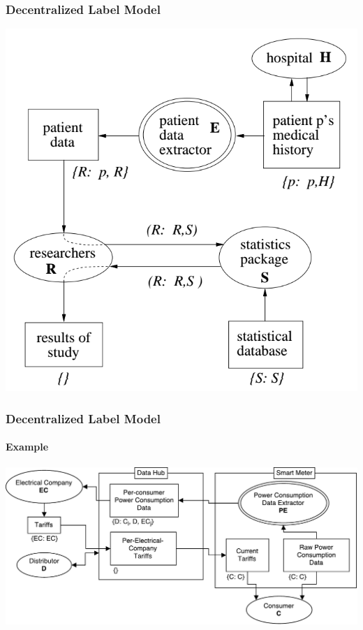 \begin{frame}
  \frametitle{Decentralized Label Model}
  \centering

  \includegraphics[height=.7\textheight]{graphics/dlm_hospital_example}
\end{frame}

\begin{frame}
  \frametitle{Decentralized Label Model}
  \framesubtitle{Example}
  \centering

  \includegraphics[width=\textwidth]{graphics/dlm_sm_example}
\end{frame}
